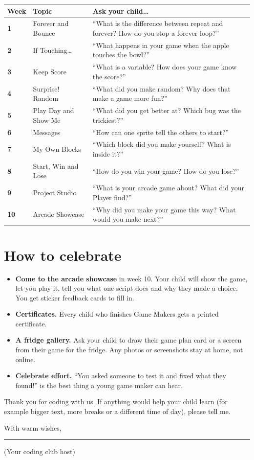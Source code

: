 \documentclass[track=junior,level=2]{kidscode}
\begin{document}
\begin{center}\small\renewcommand{\arraystretch}{1.45}
\begin{tabularx}{\linewidth}{@{}>{\bfseries}p{1.0cm}>{\RaggedRight}p{4.2cm}>{\RaggedRight\arraybackslash}X@{}}
\toprule
Week & Topic & Ask your child\dots\\
\midrule
1 & Forever and Bounce & \enquote{What is the difference between repeat and forever? How do you stop a forever loop?}\\
2 & If Touching\dots & \enquote{What happens in your game when the apple touches the bowl?}\\
3 & Keep Score & \enquote{What is a variable? How does your game know the score?}\\
4 & Surprise! Random & \enquote{What did you make random? Why does that make a game more fun?}\\
5 & Play Day and Show Me & \enquote{What did you get better at? Which bug was the trickiest?}\\
6 & Messages & \enquote{How can one sprite tell the others to start?}\\
7 & My Own Blocks & \enquote{Which block did you make yourself? What is inside it?}\\
8 & Start, Win and Lose & \enquote{How do you win your game? How do you lose?}\\
9 & Project Studio & \enquote{What is your arcade game about? What did your Player find?}\\
10 & Arcade Showcase & \enquote{Why did you make your game this way? What would you make next?}\\
\bottomrule
\end{tabularx}
\end{center}

\section{How to celebrate}
\begin{itemize}[itemsep=3pt]
  \item \textbf{Come to the arcade showcase} in week 10. Your child will show the game, let you play
        it, tell you what one script does and why they made a choice. You get sticker feedback cards to fill in.
  \item \textbf{Certificates.} Every child who finishes Game Makers gets a printed certificate.
  \item \textbf{A fridge gallery.} Ask your child to draw their game plan card or a screen from
        their game for the fridge. Any photos or screenshots stay at home, not online.
  \item \textbf{Celebrate effort.} \enquote{You asked someone to test it and fixed what they found!}
        is the best thing a young game maker can hear.
\end{itemize}

\bigskip
Thank you for coding with us. If anything would help your child learn (for example bigger text,
more breaks or a different time of day), please tell me.

\bigskip
With warm wishes,\par\bigskip
\rule{6cm}{0.4pt}\par
{\small (Your coding club host)}
\end{document}

